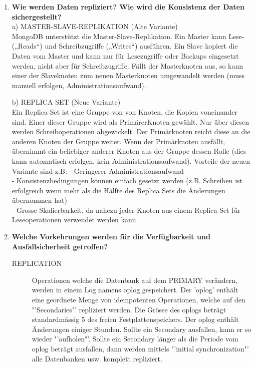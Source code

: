 \documentclass[a4paper,10pt,titlepage=false]{scrreprt}
\newcommand{\pic}[2][figure]{\begin{figure}[h]
 \centering
 \texttt{[image: \#2]}
 \caption{#1}
\end{figure}
}
\begin{document}
\begin{itemize}
\begin{enumerate}
\begin{itemize}
\item Jedes Dokument in der gleichen Sammlung kann verschiedene Felder haben.
\item Das Format wird BSON genannt und ist ähnlich wie JSON, jedoch in binärer Form damit es schneller Verarbeitet werden kann.
\item \pic{mdbapi.png}
\item \pic{mdbapi2.png}
\item \pic{mdbapiextra.png}
\item \pic{mdbsh.png}
  \end{itemize}
\item \textbf{Wie werden Daten repliziert? Wie wird die Konsistenz der Daten sichergestellt?}\\
a) MASTER-SLAVE-REPLIKATION (Alte Variante)\\
MongoDB unterstützt die Master-Slave-Replikation. Ein Master kann Lese- („Reads“) und Schreibzugriffe („Writes“) ausführen. Ein Slave kopiert die Daten vom Master und kann nur für Lesezugriffe oder Backups eingesetzt werden, nicht aber für Schreibzugriffe. Fällt der Masterknoten aus, so kann einer der Slaveknoten zum neuen Masterknoten umgewandelt werden (muss manuell erfolgen, Administrationsaufwand).

b) REPLICA SET (Neue Variante)\\
Ein Replica Set ist eine Gruppe von von Knoten, die Kopien voneinander sind. Einer dieser Gruppe wird als PrimärerKnoten gewählt. Nur über diesen werden Schreiboperationen abgewickelt. Der Primärknoten reicht diese an die anderen Knoten der Gruppe weiter. Wenn der Primärknoten ausfällt, übernimmt ein beliebiger anderer Knoten aus der Gruppe dessen Rolle (dies kann automatisch erfolgen, kein Administrationsaufwand). Vorteile der neuen Variante sind z.B:
- Geringerer Administrationsaufwand\\
- Konsistenzbedingungen können einfach gesetzt werden (z.B. Schreiben ist erfolgreich wenn mehr als die Hälfte des Replica Sets die Änderungen übernommen hat)\\
- Grosse Skalierbarkeit, da nahezu jeder Knoten aus einem Replica Set für Leseoperationen verwendet werden kann\\
\item \textbf{Welche Vorkehrungen werden für die Verfügbarkeit und Ausfallsicherheit getroffen?} \\
\begin{description}
\item[REPLICATION]
Operationen welche die Datenbank auf dem PRIMARY verändern, werden in einem Log namens
oplog gespeichert. Der 'oplog' enthält eine geordnete Menge von idempotenten Operationen,
welche auf den "'Secondaries"' repliziert werden. Die Grösse des oplogs beträgt standardmässig 5%
des freien Festplattenspeichers. Der oplog enthält Änderungen einiger Stunden.
Sollte ein Secondary ausfallen, kann er so wieder "'aufholen"'. Sollte ein Secondary länger als
die Periode vom oplog beträgt ausfallen, dann werden mittels "'initial synchronization"' alle Datenbanken usw. komplett
repliziert.


\end{description}
\end{enumerate}
\end{itemize}
\end{document}
